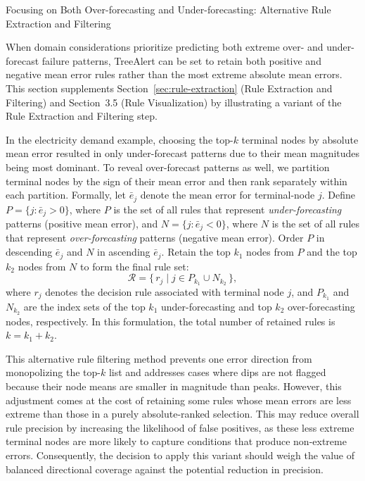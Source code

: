 \documentclass[ijds,dblanonrev]{informs4}
\begin{document}
\begin{APPENDIX}{Focusing on Both Over-forecasting and Under-forecasting: Alternative Rule Extraction and Filtering}
\label{append-A}

When domain considerations prioritize predicting both extreme over- and under-forecast failure patterns, TreeAlert can be set to retain both positive and negative mean error rules rather than the most extreme absolute mean errors. 
This section supplements Section~\ref{sec:rule-extraction} (Rule Extraction and Filtering) and Section~3.5 (Rule Visualization) by illustrating a variant of the Rule Extraction and Filtering step. 

In the electricity demand example, choosing the top-$k$ terminal nodes by absolute mean error resulted in only under-forecast patterns due to their mean magnitudes being most dominant. To reveal over-forecast patterns as well, we partition terminal nodes by the sign of their mean error and then rank separately within each partition. Formally, let $\bar e_j$ denote the mean error for terminal-node $j$. Define $P=\{j:\bar e_j>0\}$, where $P$ is the set of all rules that represent \textit{under-forecasting} patterns (positive mean error), and $N=\{j:\bar e_j<0\}$, where $N$ is the set of all rules that represent \textit{over-forecasting} patterns (negative mean error). Order $P$ in descending $\bar e_j$ and $N$ in ascending $\bar e_j$. Retain the top $k_1$ nodes from $P$ and the top $k_2$ nodes from $N$ to form the final rule set:
\begin{equation}
\mathcal{R} = \{\, r_j \;|\; j \in P_{k_1} \cup N_{k_2} \,\},
\end{equation}
where $r_j$ denotes the decision rule associated with terminal node $j$, and $P_{k_1}$ and $N_{k_2}$ are the index sets of the top $k_1$ under-forecasting and top $k_2$ over-forecasting nodes, respectively. In this formulation, the total number of retained rules is $k = k_1 + k_2$. 

This alternative rule filtering method prevents one error direction from monopolizing the top-$k$ list and addresses cases where dips are not flagged because their node means are smaller in magnitude than peaks. However, this adjustment comes at the cost of retaining some rules whose mean errors are less extreme than those in a purely absolute-ranked selection. This may reduce overall rule precision by increasing the likelihood of false positives, as these less extreme terminal nodes are more likely to capture conditions that produce non-extreme errors. Consequently, the decision to apply this variant should weigh the value of balanced directional coverage against the potential reduction in precision.


\end{APPENDIX}
\end{document}
